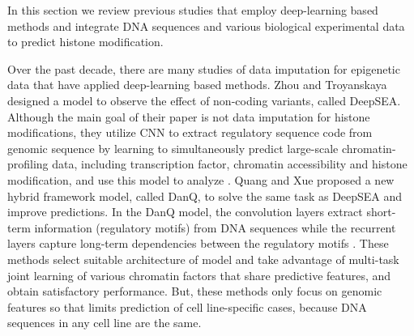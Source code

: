 \hspace{24pt}

In this section we review previous studies that employ deep-learning based methods and integrate DNA sequences and various biological experimental data to predict histone modification.

Over the past decade, there are many studies of data imputation for epigenetic data that have applied deep-learning based methods. Zhou and Troyanskaya designed a model to observe the effect of non-coding variants, called DeepSEA. Although the main goal of their paper is not data imputation for histone modifications, they utilize CNN to extract regulatory sequence code from genomic sequence by learning to simultaneously predict large-scale chromatin-profiling data, including transcription factor, chromatin accessibility and histone modification, and use this model to analyze \cite{zhou2015predicting}. Quang and Xue proposed a new hybrid framework model, called DanQ, to solve the same task as DeepSEA and improve predictions. In the DanQ model, the convolution layers extract short-term information (regulatory motifs) from DNA sequences while the recurrent layers capture long-term dependencies between the regulatory motifs \cite{quang2016danq}. These methods select suitable architecture of model and take advantage of multi-task joint learning of various chromatin factors that share predictive features, and obtain satisfactory performance. But, these methods only focus on genomic features so that limits prediction of cell line-specific cases, because DNA sequences in any cell line are the same.


